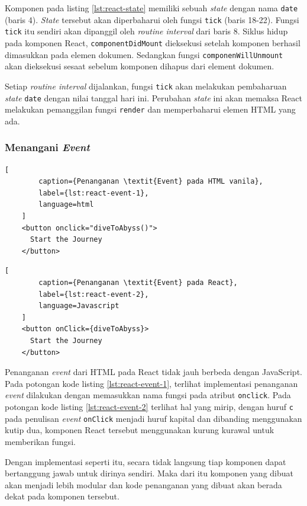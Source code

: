     Komponen pada listing \ref{lst:react-state} memiliki sebuah \textit{state}
    dengan nama \texttt{date} (baris 4). \textit{State} tersebut akan
    diperbaharui oleh fungsi \texttt{tick} (baris 18-22). Fungsi \texttt{tick}
    itu sendiri akan dipanggil oleh \textit{routine interval} dari baris 8.
    Siklus hidup pada komponen React, \texttt{componentDidMount} dieksekusi
    setelah komponen berhasil dimasukkan pada elemen dokumen. Sedangkan fungsi
    \texttt{componenWillUnmount} akan dieksekusi sesaat sebelum komponen dihapus
    dari element dokumen.
    
    Setiap \textit{routine interval} dijalankan, fungsi \texttt{tick} akan
    melakukan pembaharuan \textit{state} \texttt{date} dengan nilai tanggal hari
    ini. Perubahan \textit{state} ini akan memaksa React melakukan pemanggilan
    fungsi \texttt{render} dan memperbaharui elemen HTML yang ada.
    
    \subsubsection{Menangani \textit{Event}}
    \begin{lstlisting}[
        caption={Penanganan \textit{Event} pada HTML vanila}, 
        label={lst:react-event-1}, 
        language=html
    ]
    <button onclick="diveToAbyss()">
      Start the Journey
    </button>
    \end{lstlisting}
    
    \begin{lstlisting}[
        caption={Penanganan \textit{Event} pada React}, 
        label={lst:react-event-2}, 
        language=Javascript
    ]
    <button onClick={diveToAbyss}>
      Start the Journey
    </button>
    \end{lstlisting}
    
    Penanganan \textit{event} dari HTML pada React tidak jauh berbeda dengan
    JavaScript. Pada potongan kode listing \ref{lst:react-event-1}, terlihat
    implementasi penanganan \textit{event} dilakukan dengan memasukkan nama
    fungsi pada atribut \texttt{onclick}. Pada potongan kode listing
    \ref{lst:react-event-2} terlihat hal yang mirip, dengan huruf \texttt{c}
    pada penulisan \textit{event} \texttt{onClick} menjadi huruf kapital dan
    dibanding menggunakan kutip dua, komponen React tersebut menggunakan kurung
    kurawal untuk memberikan fungsi.
    
    Dengan implementasi seperti itu, secara tidak langsung tiap komponen dapat
    bertanggung jawab untuk dirinya sendiri. Maka dari itu komponen yang dibuat
    akan menjadi lebih modular dan kode penanganan yang dibuat akan berada dekat
    pada komponen tersebut.
    
